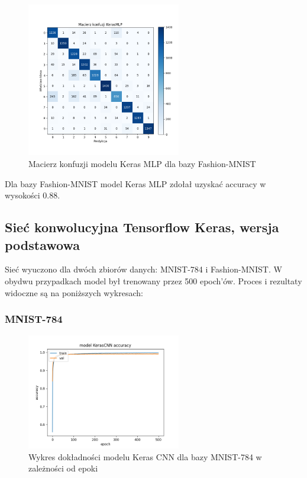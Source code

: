 \documentclass{article}
\begin{document}
\begin{figure}[H]
	\centering
	\includegraphics[width=0.6\textwidth]{../Saves/KerasMLP/fashion-mnist/KerasMLP_fashion-mnist_conf_mat.png}
	\caption{Macierz konfuzji modelu Keras MLP dla bazy Fashion-MNIST}
\end{figure}
Dla bazy Fashion-MNIST model Keras MLP zdołał uzyskać accuracy w wysokości $0.88$.



\subsection{Sieć konwolucyjna Tensorflow Keras, wersja podstawowa}
Sieć wyuczono dla dwóch zbiorów danych: MNIST-784 i Fashion-MNIST. W obydwu przypadkach model
był trenowany przez 500 epoch'ów. Proces i rezultaty widoczne są na poniższych wykresach:

\subsubsection{MNIST-784}
\begin{figure}[H]
    \centering
    \includegraphics[width=0.6\textwidth]{../Saves/KerasCNN/mnist-784/KerasCNN_mnist_784_ep500_acc.png}
    \caption{Wykres dokładności modelu Keras CNN dla bazy MNIST-784 w zależności od epoki}
\end{figure}
\end{document}
